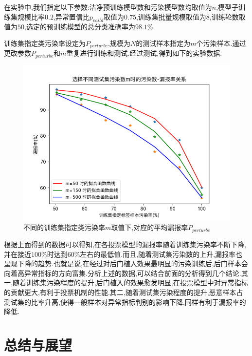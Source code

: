 在实验中,我们指定以下参数:洁净预训练模型数和污染模型数均取值为$n$,模型子训练集规模比率$0.2$,异常置信比$p_{vaild}$取值为$0.75$,训练集批量规模取值为$8$,训练轮数取值为$50$,选定的预训练模型的总分类准确率为$98.1\%$.

训练集指定类污染率设定为$P_{perturbe}$,规模为$N$的测试样本指定为$m$个污染样本.通过更改参数$P_{perturbe}$和$m$重复进行训练和测试.经过测试,得到如下的实验数据.
\begin{figure}[H]
	\centering
	\includegraphics[scale=0.7]{Figures/tutu.png}
	\caption{不同的训练集指定类污染率$m$取值下,对应的平均漏报率$P_{perturbe}$}
\end{figure}

根据上面得到的数据可以得知,在各投票模型的漏报率随着训练集污染率不断下降,并在接近$100\%$时达到$60\%$左右的最低值.而且,随着测试集污染数的上升,漏报率也呈现下降的趋势.也就是说,在经过对后门植入效果最明显的污染训练后,后门样本会向着高异常指标的方向富集.分析上述的数据,可以结合前面的分析得到几个结论.其一,随着训练集污染程度的提升,后门植入的效果愈发明显,在投票模型中对异常指标的贡献更大,有利于投票机制的性能.其二,随着测试集污染程度的提升,恶意样本占测试集的比率升高,使得一般样本对异常指标判别的影响下降,同样有利于漏报率的降低.

\chapter{总结与展望}

